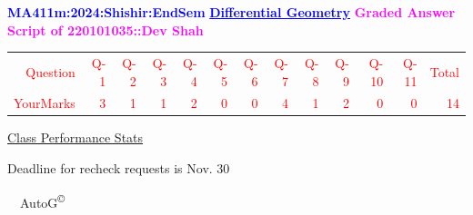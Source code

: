 \documentclass{article}                              %
\begin{document}
%
\vspace*{1in}

\begin{center}
	\textbf{\textcolor{blue}{\LARGE MA411m:2024:Shishir:EndSem}}
	\vskip 1cm
	\textbf{\textcolor{blue}{\underline{\Large Differential Geometry}}}
	\vskip 1cm
	\textbf{\textcolor{magenta}{\LARGE Graded Answer Script of 220101035::Dev Shah}}
\end{center}


\begin{center}
	\Huge 
	\textcolor{red}{
	\begin{tabular}{*{13}{r}}
		Question&Q-1& Q-2& Q-3& Q-4& Q-5& Q-6& Q-7& Q-8& Q-9& Q-10& Q-11&Total  \\
        	YourMarks&3&1&1&2&0&0&4&1&2&0&0&14
	\end{tabular}
	}
        \vskip 2cm
	\large
	\underline{Class Performance Stats}
	\DTLsetseparator{;}
	\begin{table}[htbp]
		\centering
	\end{table}
	\vskip 1cm
	Deadline for recheck requests is Nov. 30
\end{center}
\ \vfill \ \hfill \small AutoG\textsuperscript{\copyright}
\newpage
%
\end{document}
